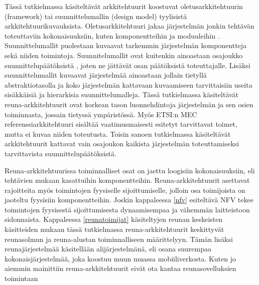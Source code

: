 Tässä tutkielmassa käsiteltävät arkkitehtuurit koostuvat oletusarkkitehtuurin (framework) tai suunnittelumallin (design model) tyylisistä arkkitehtuurikuvauksista. 
Oletusarkkitehtuuri jakaa järjestelmän jonkin tehtävän toteuttaviin kokonaisuuksiin, kuten komponentteihin ja moduuleihin \cite{ohark}. 
Suunnittelumallit puolestaan kuvaavat tarkemmin järjestelmän komponentteja sekä niiden toimintoja. Suunnitelumallit ovat kuitenkin ainoastaan osajoukko suunnittelupäätöksistä \cite{ohark2}, joten ne jättävät osan päätöksistä toteuttajalle. Lisäksi suunnittelumallit kuvaavat järjestelmää ainoastaan jollain tietyllä abstraktiotasolla ja koko järjestelmän kattavaan kuvaamiseen tarvittaisiin useita sisäkkäisiä ja hierarkisia suunnittelumalleja. 
Tässä tutkielmassa käsiteltävät reuna-arkkitehtuurit ovat korkean tason luonnehdintoja järjestelmän ja sen osien toiminnasta, jossain tietyssä ympäristössä.
Myös ETSI:n MEC referenssiarkkitehtuuri \cite{etsirefarch} sisältää vaatimusmaisesti esitetyt tarvittavat toimet, mutta ei kuvaa niiden toteutusta.
Toisin sanoen tutkielmassa käsiteltävät arkkitehtuurit kattavat vain osajoukon kaikista järjestelmän toteuttamiseksi tarvittavista suunnittelupäätöksistä.
 
Reuna-arkkitehtuurissa toiminnalliset osat on jaettu loogisiin kokonaisuuksiin, eli tehtävien mukaan kasattuihin komponentteihin. Reuna-arkkitehtuurit asettavat rajoitteita myös toimintojen fyysiselle sijoittumiselle, jolloin osa toimijoista on jaoteltu fyysisiin komponentteihin. Joskin kappaleessa \ref{nfv} esiteltävä NFV tekee toimintojen fyysisestä sijoittumisesta dynaamisempaa ja vähemmän laitteistoon sidonnaista. 
Kappaleessa \ref{reunatoimijat} käsiteltyjen reunan keskeisten käsitteiden mukaan tässä tutkielmassa reuna-arkkitehtuurit keskittyvät reunasolmun ja reuna-alustan toiminnalliseen määrittelyyn. 
Tämän lisäksi reunajärjestelmää käsitellään alijärjestelmänä, eli osana suurempaa kokonaisjärjestelmää, joka koostuu muun muassa mobiiliverkosta.
Kuten jo aiemmin mainittiin reuna-arkkitehtuurit eivät ota kantaa reunasovelluksien toimintaan



